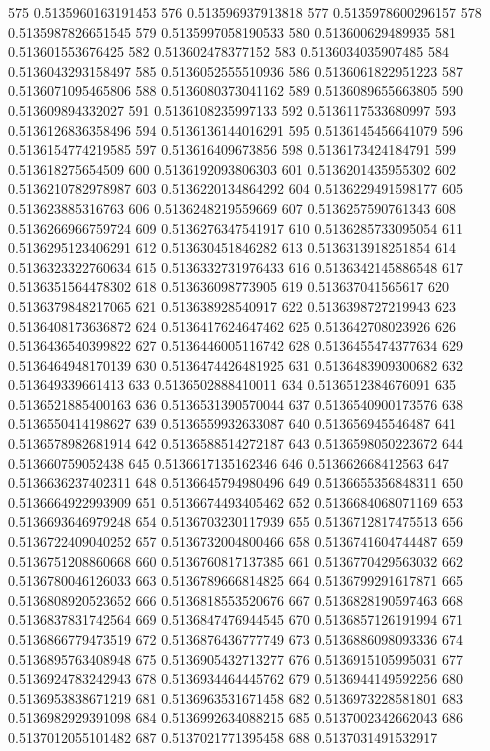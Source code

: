575 0.5135960163191453
576 0.513596937913818
577 0.5135978600296157
578 0.5135987826651545
579 0.5135997058190533
580 0.513600629489935
581 0.513601553676425
582 0.513602478377152
583 0.5136034035907485
584 0.5136043293158497
585 0.5136052555510936
586 0.5136061822951223
587 0.5136071095465806
588 0.5136080373041162
589 0.5136089655663805
590 0.513609894332027
591 0.5136108235997133
592 0.5136117533680997
593 0.5136126836358496
594 0.5136136144016291
595 0.5136145456641079
596 0.5136154774219585
597 0.513616409673856
598 0.5136173424184791
599 0.513618275654509
600 0.5136192093806303
601 0.5136201435955302
602 0.5136210782978987
603 0.5136220134864292
604 0.5136229491598177
605 0.513623885316763
606 0.5136248219559669
607 0.5136257590761343
608 0.5136266966759724
609 0.5136276347541917
610 0.5136285733095054
611 0.5136295123406291
612 0.513630451846282
613 0.5136313918251854
614 0.5136323322760634
615 0.5136332731976433
616 0.5136342145886548
617 0.5136351564478302
618 0.513636098773905
619 0.513637041565617
620 0.5136379848217065
621 0.513638928540917
622 0.5136398727219943
623 0.5136408173636872
624 0.5136417624647462
625 0.513642708023926
626 0.5136436540399822
627 0.5136446005116742
628 0.5136455474377634
629 0.5136464948170139
630 0.5136474426481925
631 0.5136483909300682
632 0.513649339661413
633 0.5136502888410011
634 0.5136512384676091
635 0.5136521885400163
636 0.5136531390570044
637 0.5136540900173576
638 0.5136550414198627
639 0.5136559932633087
640 0.513656945546487
641 0.5136578982681914
642 0.5136588514272187
643 0.5136598050223672
644 0.513660759052438
645 0.5136617135162346
646 0.513662668412563
647 0.5136636237402311
648 0.5136645794980496
649 0.5136655356848311
650 0.5136664922993909
651 0.5136674493405462
652 0.5136684068071169
653 0.5136693646979248
654 0.5136703230117939
655 0.5136712817475513
656 0.5136722409040252
657 0.5136732004800466
658 0.5136741604744487
659 0.5136751208860668
660 0.5136760817137385
661 0.5136770429563032
662 0.5136780046126033
663 0.5136789666814825
664 0.5136799291617871
665 0.5136808920523652
666 0.5136818553520676
667 0.5136828190597463
668 0.5136837831742564
669 0.5136847476944545
670 0.5136857126191994
671 0.5136866779473519
672 0.5136876436777749
673 0.5136886098093336
674 0.5136895763408948
675 0.5136905432713277
676 0.5136915105995031
677 0.5136924783242943
678 0.5136934464445762
679 0.5136944149592256
680 0.5136953838671219
681 0.5136963531671458
682 0.5136973228581801
683 0.5136982929391098
684 0.5136992634088215
685 0.5137002342662043
686 0.5137012055101482
687 0.5137021771395458
688 0.5137031491532917
